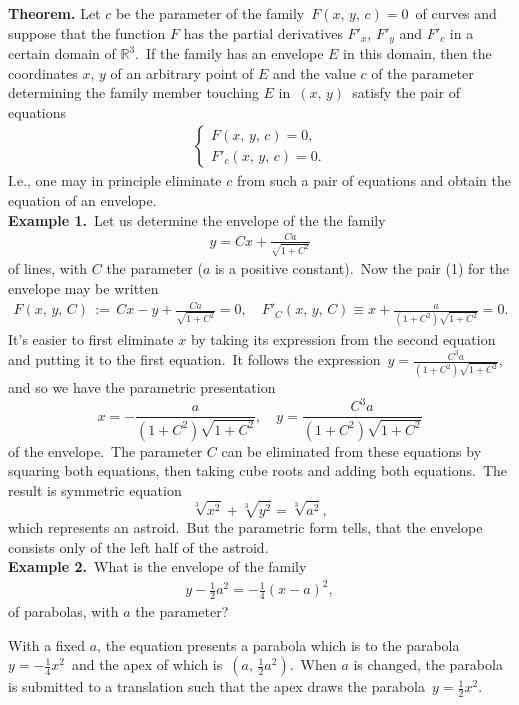 \documentclass[12pt]{article}
\theoremstyle{definition}
\begin{document}
\textbf{Theorem.}\; Let $c$ be the parameter of the family\, $F(x,\,y,\,c) = 0$\, of curves and suppose that the function $F$ has the partial derivatives $F'_x$, $F'_y$ and $F'_c$ in a certain domain of $\mathbb{R}^3$.\, If the family has an envelope $E$ in this domain, then the coordinates $x,\,y$ of an arbitrary point of $E$ and the value $c$ of the parameter determining the family member touching $E$ in\, $(x,\,y)$\, satisfy the pair of equations
\begin{align}
\begin{cases}
  F(x,\,y,\,c) = 0,\\
  F'_c(x,\,y,\,c) = 0.
\end{cases}
\end{align}
I.e., one may in principle eliminate $c$ from such a pair of equations and obtain the equation of an envelope.\\

\textbf{Example 1.}\, Let us determine the envelope of the the family
\begin{align}
y = Cx+\frac{Ca}{\sqrt{1+C^2}}
\end{align}
of lines, with $C$ the parameter ($a$ is a positive constant).\, Now the pair (1) for the envelope may be written
\begin{align}
 F(x,\,y,\,C)\, := \,Cx-y+\frac{Ca}{\sqrt{1+C^2}} = 0,\quad
 F'_C(x,\,y,\,C) \equiv x+\frac{a}{(1+C^2)\sqrt{1+C^2}} = 0.
\end{align}
It's easier to first eliminate $x$ by taking its expression from the second equation and putting it to the first equation.\, It follows the expression\, $y = \frac{C^3a}{(1+C^2)\sqrt{1+C^2}}$,\, and so we have the parametric presentation
$$x= -\frac{a}{(1+C^2)\sqrt{1+C^2}},\quad y = \frac{C^3a}{(1+C^2)\sqrt{1+C^2}}$$
of the envelope.\, The parameter $C$ can be eliminated from these equations by squaring both equations, then taking cube roots and adding both equations.\, The result is symmetric equation
$$\sqrt[3]{x^2}+\sqrt[3]{y^2} = \sqrt[3]{a^2},$$
which represents an astroid.\, But the parametric form tells, that the envelope consists only of the left half of the astroid.\\

\textbf{Example 2.}\, What is the envelope of the family
\begin{align}
y-\frac{1}{2}a^2 = -\frac{1}{4}(x-a)^2,
\end{align}
of parabolas, with $a$ the parameter?

With a fixed $a$, the equation presents a parabola which is  to the parabola\, $y = -\frac{1}{4}x^2$\, and the apex of which is\, $(a,\,\frac{1}{2}a^2)$.\, When $a$ is changed, the parabola is submitted to a translation such that the apex draws the parabola\, $y = \frac{1}{2}x^2.$
\end{document}
